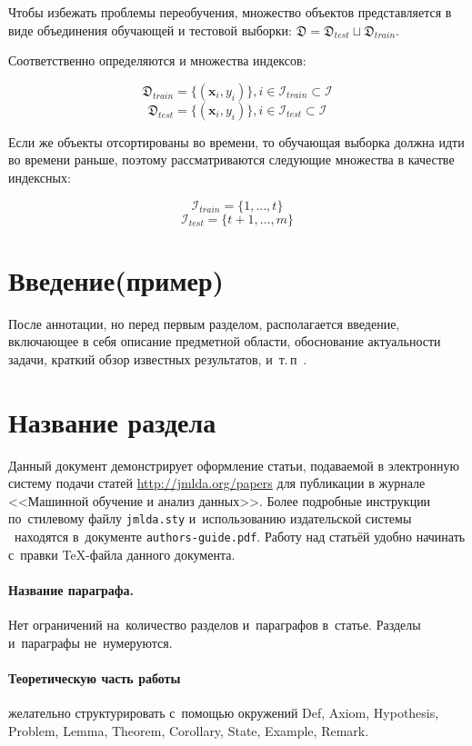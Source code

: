 \documentclass[12pt,twoside]{article}
\begin{document}
Чтобы избежать проблемы переобучения, множество объектов представляется в виде объединения обучающей и тестовой выборки: $\mathfrak{D} = \mathfrak{D}_{test} \sqcup \mathfrak{D}_{train}$.

Соответственно определяются и множества индексов:

$$ \mathfrak{D}_{train} = \{(\mathbf{x}_i, y_i)\}, i \in \mathcal{I}_{train} \subset \mathcal{I} $$
$$ \mathfrak{D}_{test} = \{(\mathbf{x}_i, y_i)\}, i \in \mathcal{I}_{test} \subset \mathcal{I} $$

Если же объекты отсортированы во времени, то обучающая выборка должна идти во времени раньше, поэтому рассматриваются следующие множества в качестве индексных:

$$ \mathcal{I}_{train} = \{1, ..., t\} $$
$$ \mathcal{I}_{test} = \{t + 1, ..., m\} $$

\section{Введение(пример)}
После аннотации, но перед первым разделом,
располагается введение, включающее в себя
описание предметной области,
обоснование актуальности задачи,
краткий обзор известных результатов,
и~т.\,п~\cite{author09anyscience,myHandbook,author09first-word-of-the-title,voron06latex,author-and-co2007,Lvovsky03}.

\section{Название раздела}
Данный документ демонстрирует оформление статьи,
подаваемой в электронную систему подачи статей \url{http://jmlda.org/papers} для публикации в журнале <<Машинной обучение и анализ данных>>.
Более подробные инструкции по~стилевому файлу \texttt{jmlda.sty}
и~использованию издательской системы \LaTeXe\
находятся в~документе \texttt{authors-guide.pdf}.
Работу над статьёй удобно начинать с~правки \TeX-файла данного документа.

\paragraph{Название параграфа.}
Нет ограничений на~количество разделов и~параграфов в~статье.
Разделы и~параграфы не~нумеруются.

\paragraph{Теоретическую часть работы} желательно структурировать
с~помощью окружений
Def, Axiom, Hypothesis, Problem, Lemma, Theorem, Corollary, State, Example, Remark.
\end{document}
